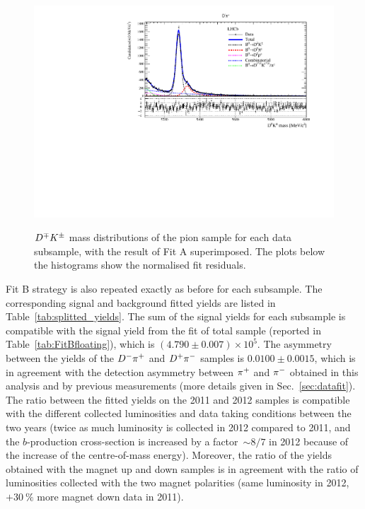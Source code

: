 \begin{figure}[htbp]
\begin{center}
		\includegraphics[width=0.48\linewidth]{03Massfit/figs/MDFitPlots_Bd_pip/MDFit_BeautyMass_Bd2DK_withPulls.pdf} \\
		\vspace{-2mm}
                \caption{$D^\mp K^\pm$ mass distributions of the pion sample for each data subsample, with the result of Fit A
                  superimposed. The plots below the histograms show the normalised fit residuals.
		\label{fig:splitfitK}}
	\end{center}
\end{figure}

Fit B strategy is also repeated exactly as before for each subsample. The
corresponding signal and background fitted yields are listed in
Table~\ref{tab:splitted_yields}. The sum of the signal yields for each subsample
is compatible with the signal yield from the fit of total sample (reported in
Table~\ref{tab:FitBfloating}), which is $(4.790\pm0.007)\times10^{5}$.
The asymmetry between the yields of the $D^-\pi^+$ and $D^+\pi^-$ samples 
is $0.0100\pm0.0015$, which is in agreement with the detection asymmetry between 
$\pi^+$ and $\pi^-$ obtained in this analysis and by previous measurements (more details given in Sec.~\ref{sec:datafit}).
The ratio between the fitted yields on the 2011 and 2012 samples is compatible with the different collected luminosities and data taking conditions 
between the two years (twice as much luminosity is collected in 2012 compared to 2011, and the $b$-production cross-section is increased by a factor~$\sim8/7$ in 2012 
because of the increase of the centre-of-mass energy).
Moreover, the ratio of the yields obtained with the magnet up and down samples is in agreement with the ratio of luminosities collected
with the two magnet polarities (same luminosity in 2012, $+30~\%$ more magnet down data in 2011).

